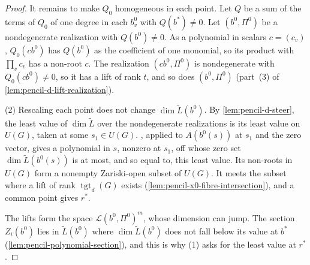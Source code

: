 \begin{proof}
  It remains to make $Q_0$ homogeneous in each point. Let $Q$ be a sum of
  the terms of $Q_0$ of one degree in each $b^0_v$ with $Q(b^*) \ne 0$.
  Let $(b^0, \Pi^0)$ be a nondegenerate realization with $Q(b^0) \ne 0$.
  As a polynomial in scalars $c = (c_v)$, $Q_0(c b^0)$ has $Q(b^0)$ as the
  coefficient of one monomial, so its product with $\prod_v c_v$ has a
  non-root $c$. The realization $(c b^0, \Pi^0)$ is nondegenerate with
  $Q_0(c b^0) \ne 0$, so it has a lift of rank $t$, and so does
  $(b^0, \Pi^0)$ (part~(3) of \cref{lem:pencil-d-lift-realization}).

  (2) Rescaling each point does not change $\dim \widetilde L(b^0)$. By
  \cref{lem:pencil-d-steer}, the least value of $\dim \widetilde L$ over
  the nondegenerate realizations is its least value on $U(G)$, taken at
  some $s_1 \in U(G)$. , applied to
  $A(b^0(s))$ at $s_1$ and the zero vector, gives a polynomial in $s$,
  nonzero at $s_1$, off whose zero set $\dim \widetilde L(b^0(s))$ is at
  most, and so equal to, this least value. Its non-roots in $U(G)$ form a
  nonempty Zariski-open subset of $U(G)$. It meets the subset where a
  lift of rank $\operatorname{tgt}_d(G)$ exists
  (\cref{lem:pencil-x0-fibre-intersection}), and a common point gives
  $r^*$.

  The lifts form the space $\mathcal{L}(b^0, \Pi^0)^m$, whose dimension
  can jump. The section $Z_i(b^0)$ lies in $\widetilde L(b^0)$ where
  $\dim \widetilde L(b^0)$ does not fall below its value at $b^*$
  (\cref{lem:pencil-polynomial-section}), and this is why (1) asks for
  the least value at $r^*$.
\end{proof}


